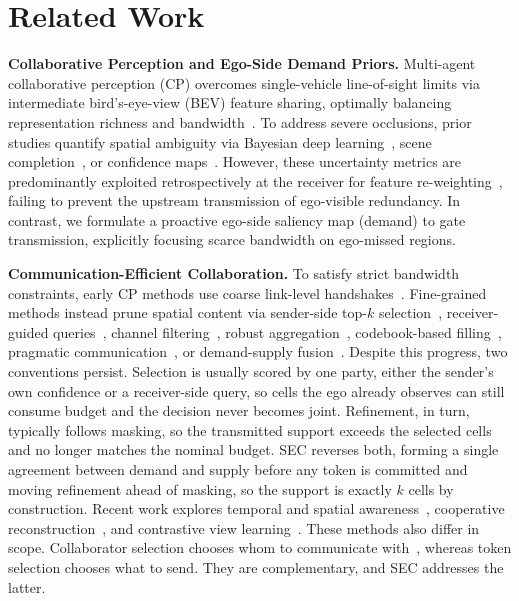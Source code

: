 \section{Related Work}
\label{sec:related}
\noindent\textbf{Collaborative Perception and Ego-Side Demand Priors.} Multi-agent collaborative perception (CP) overcomes single-vehicle line-of-sight limits via intermediate bird's-eye-view (BEV) feature sharing, optimally balancing representation richness and bandwidth~\cite{opv2v,v2vnet,v2xvit,dairv2x,v2xseq,v2v4real}. To address severe occlusions, prior studies quantify spatial ambiguity via Bayesian deep learning~\cite{kendall2017uncertainties}, scene completion~\cite{monoscene}, or confidence maps~\cite{where2comm}. However, these uncertainty metrics are predominantly exploited retrospectively at the receiver for feature re-weighting~\cite{coalign,hm_vit}, failing to prevent the upstream transmission of ego-visible redundancy. In contrast, we formulate a proactive ego-side saliency map (demand) to gate transmission, explicitly focusing scarce bandwidth on ego-missed regions.

\noindent\textbf{Communication-Efficient Collaboration.} To satisfy strict bandwidth constraints, early CP methods use coarse link-level handshakes~\cite{who2com,when2com}. Fine-grained methods instead prune spatial content via sender-side top-$k$ selection~\cite{where2comm}, receiver-guided queries~\cite{hm_vit,quest2024}, channel filtering~\cite{whispernet}, robust aggregation~\cite{ermvp}, codebook-based filling~\cite{codefilling}, pragmatic communication~\cite{pragmatic}, or demand-supply fusion~\cite{cosdh}. Despite this progress, two conventions persist. Selection is usually scored by one party, either the sender's own confidence or a receiver-side query, so cells the ego already observes can still consume budget and the decision never becomes joint. Refinement, in turn, typically follows masking, so the transmitted support exceeds the selected cells and no longer matches the nominal budget. SEC reverses both, forming a single agreement between demand and supply before any token is committed and moving refinement ahead of masking, so the support is exactly $k$ cells by construction. Recent work explores temporal and spatial awareness~\cite{scope2023}, cooperative reconstruction~\cite{core2023}, and contrastive view learning~\cite{collabviews}. These methods also differ in scope. Collaborator selection chooses whom to communicate with~\cite{who2com,when2com,select2col}, whereas token selection chooses what to send. They are complementary, and SEC addresses the latter.

